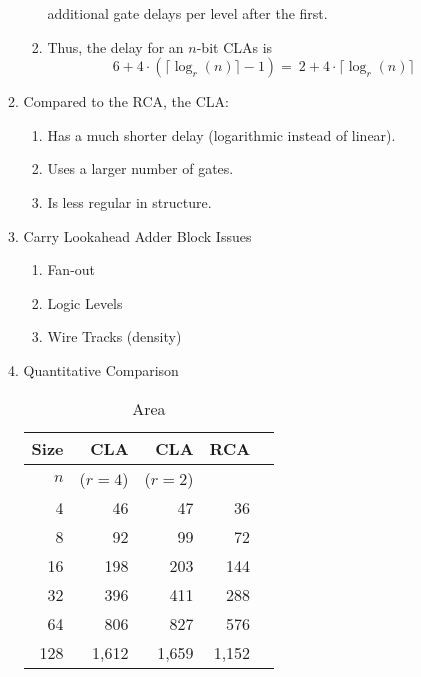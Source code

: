 \documentclass[times, twocolumn, 10pt]{article}
\begin{document}
\begin{enumerate}
\begin{enumerate}
\begin{enumerate}
      additional gate 
      delays per level after the first. 
    \item Thus, the delay for an $n$-bit CLAs is
      \begin{displaymath}
        6 + 4 \cdot (\lceil \log_{r}(n) \rceil - 1) = \
	2 + 4 \cdot \lceil \log_{r}(n) \rceil
      \end{displaymath}
    \end{enumerate}
  \item Compared to the RCA, the CLA:
    \begin{enumerate}
    \item Has a much shorter delay (logarithmic instead of linear).
    \item Uses a larger number of gates.
    \item Is less regular in structure. 
    \end{enumerate}
  \item Carry Lookahead Adder Block Issues
    \begin{enumerate}
    \item Fan-out
    \item Logic Levels
    \item Wire Tracks (density)
    \end{enumerate}
  \item Quantitative Comparison
    \begin{table} [ht]
      \centering
      \label{cla1.tbl}
      \begin{tabular}{|r|r|r|r|r|} \hline 
        Size & CLA      & CLA      & RCA   \\  \hline
        $n$ &  ($r=4$) & ($r=2$)  &       \\ \hline \hline
        4  &  46      &  47      & 36    \\ \hline 
        8  &  92      &  99      & 72    \\ \hline
        16  &  198     &  203     & 144   \\ \hline 
        32  &  396     &  411     & 288   \\ \hline 
        64  &  806     &  827     & 576   \\ \hline 
        128 &  1,612   &  1,659   & 1,152 \\ \hline
      \end{tabular}
      \caption{Area}
    \end{table}
    \begin{table} [ht]
      \centering
      \label{cla2.tbl}
      \begin{tabular}{|r|r|r|r|r|} \hline 

\end{tabular}
\end{table}
\end{enumerate}
\end{enumerate}
\end{document}
